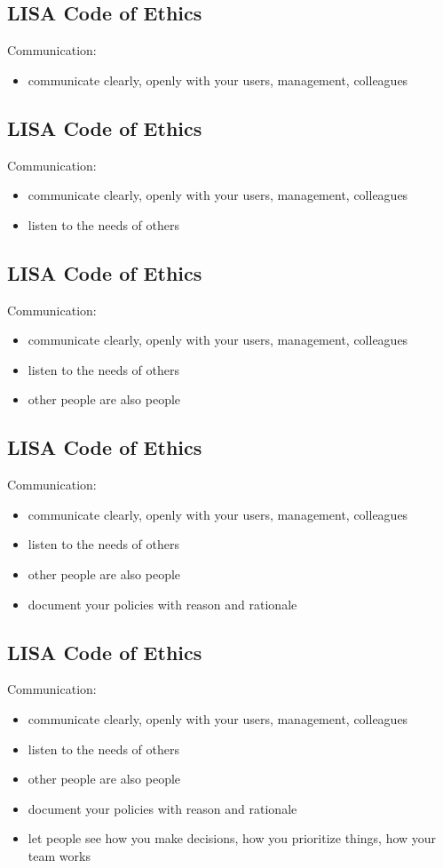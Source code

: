 \documentclass[xga]{xdvislides}
\begin{document}
\subsection{LISA Code of Ethics}
Communication:
\begin{itemize}
	\item communicate clearly, openly with your users, management, colleagues
\end{itemize}

\subsection{LISA Code of Ethics}
Communication:
\begin{itemize}
	\item communicate clearly, openly with your users, management, colleagues
	\item listen to the needs of others
\end{itemize}

\subsection{LISA Code of Ethics}
Communication:
\begin{itemize}
	\item communicate clearly, openly with your users, management, colleagues
	\item listen to the needs of others
	\item other people are also people
\end{itemize}

\subsection{LISA Code of Ethics}
Communication:
\begin{itemize}
	\item communicate clearly, openly with your users, management, colleagues
	\item listen to the needs of others
	\item other people are also people
	\item document your policies with reason and rationale
\end{itemize}

\subsection{LISA Code of Ethics}
Communication:
\begin{itemize}
	\item communicate clearly, openly with your users, management, colleagues
	\item listen to the needs of others
	\item other people are also people
	\item document your policies with reason and rationale
	\item let people see how you make decisions,
		how you prioritize things, how your team works
\end{itemize}
\end{document}
